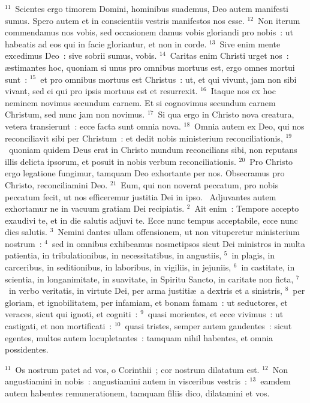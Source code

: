 ${}^{11}$~Scientes ergo timorem Domini, hominibus suademus, Deo autem manifesti sumus. Spero autem et in conscientiis vestris manifestos nos esse.
${}^{12}$~Non iterum commendamus nos vobis, sed occasionem damus vobis gloriandi pro nobis~: ut habeatis ad eos qui in facie gloriantur, et non in corde.
${}^{13}$~Sive enim mente excedimus Deo~: sive sobrii sumus, vobis.
${}^{14}$~Caritas enim Christi urget nos~: \ae stimantes hoc, quoniam si unus pro omnibus mortuus est, ergo omnes mortui sunt~:
${}^{15}$~et pro omnibus mortuus est Christus~: ut, et qui vivunt, jam non sibi vivant, sed ei qui pro ipsis mortuus est et resurrexit.
${}^{16}$~Itaque nos ex hoc neminem novimus secundum carnem. Et si cognovimus secundum carnem Christum, sed nunc jam non novimus.
${}^{17}$~Si qua ergo in Christo nova creatura, vetera transierunt~: ecce facta sunt omnia nova.
${}^{18}$~Omnia autem ex Deo, qui nos reconciliavit sibi per Christum~: et dedit nobis ministerium reconciliationis,
${}^{19}$~quoniam quidem Deus erat in Christo mundum reconcilians sibi, non reputans illis delicta ipsorum, et posuit in nobis verbum reconciliationis.
${}^{20}$~Pro Christo ergo legatione fungimur, tamquam Deo exhortante per nos. Obsecramus pro Christo, reconciliamini Deo.
${}^{21}$~Eum, qui non noverat peccatum, pro nobis peccatum fecit, ut nos efficeremur justitia Dei in ipso.
~\lettrine[lines=10,image=true,loversize=0.05,lraise=-0.03]{A}{}djuvantes autem exhortamur ne in vacuum gratiam Dei recipiatis.
${}^{2}$~Ait enim~: Tempore accepto exaudivi te, et in die salutis adjuvi te. Ecce nunc tempus acceptabile, ecce nunc dies salutis.
${}^{3}$~Nemini dantes ullam offensionem, ut non vituperetur ministerium nostrum~:
${}^{4}$~sed in omnibus exhibeamus nosmetipsos sicut Dei ministros in multa patientia, in tribulationibus, in necessitatibus, in angustiis,
${}^{5}$~in plagis, in carceribus, in seditionibus, in laboribus, in vigiliis, in jejuniis,
${}^{6}$~in castitate, in scientia, in longanimitate, in suavitate, in Spiritu Sancto, in caritate non ficta,
${}^{7}$~in verbo veritatis, in virtute Dei, per arma justiti\ae\ a dextris et a sinistris,
${}^{8}$~per gloriam, et ignobilitatem, per infamiam, et bonam famam~: ut seductores, et veraces, sicut qui ignoti, et cogniti~:
${}^{9}$~quasi morientes, et ecce vivimus~: ut castigati, et non mortificati~:
${}^{10}$~quasi tristes, semper autem gaudentes~: sicut egentes, multos autem locupletantes~: tamquam nihil habentes, et omnia possidentes.


${}^{11}$~Os nostrum patet ad vos, o Corinthii~; cor nostrum dilatatum est.
${}^{12}$~Non angustiamini in nobis~: angustiamini autem in visceribus vestris~:
${}^{13}$~eamdem autem habentes remunerationem, tamquam filiis dico, dilatamini et vos.


